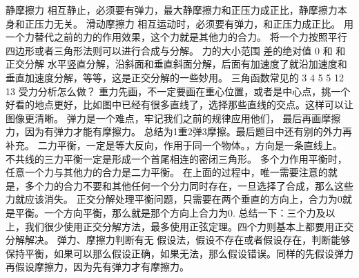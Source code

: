 \markdownRendererInterblockSeparator
{}静摩擦力 相互静止，必须要有弹力，最大静摩擦力和正压力成正比，静摩擦力本身和正压力无关。\markdownRendererParagraphSeparator
{}滑动摩擦力 相互运动时，必须要有弹力，和正压力成正比。\markdownRendererInterblockSeparator
{}
\markdownRendererSectionEnd \markdownRendererSectionBegin
{}\markdownRendererInterblockSeparator
{}用一个力替代之前的力的作用效果，这个力就是其他力的合力。\markdownRendererSoftLineBreak
{}将一个力按照平行四边形或者三角形法则可以进行合成与分解。\markdownRendererSoftLineBreak
{}力的大小范围 差的绝对值 0 和 和\markdownRendererParagraphSeparator
{}正交分解\markdownRendererParagraphSeparator
{}水平竖直分解，沿斜面和垂直斜面分解，后面有加速度了就沿加速度和垂直加速度分解，等等，这是正交分解的一些妙用。\markdownRendererParagraphSeparator
{}三角函数常见的\markdownRendererParagraphSeparator
{}3 4 5\markdownRendererSoftLineBreak
{}5 12 13\markdownRendererInterblockSeparator
{}
\markdownRendererSectionEnd \markdownRendererSectionBegin
{}\markdownRendererInterblockSeparator
{}受力分析怎么做？\markdownRendererParagraphSeparator
{}重力先画，不一定要画在重心位置，或者是中心点，挑一个好看的地点更好，比如图中已经有很多直线了，选择那些直线的交点。这样可以让图像更清晰。\markdownRendererParagraphSeparator
{}弹力是一个难点，牢记我们之前的规律应用他们，\markdownRendererParagraphSeparator
{}最后再画摩擦力，因为有弹力才能有摩擦力。\markdownRendererParagraphSeparator
{}总结为1重2弹3摩擦。最后题目中还有别的外力再补充。\markdownRendererParagraphSeparator
{}二力平衡，一定是等大反向，作用于同一个物体。，方向是一条直线上。\markdownRendererParagraphSeparator
{}不共线的三力平衡一定是形成一个首尾相连的密闭三角形。\markdownRendererParagraphSeparator
{}多个力作用平衡时，任意一个力与其他力的合力是二力平衡。\markdownRendererParagraphSeparator
{}在上面的过程中，唯一需要注意的就是，多个力的合力不要和其他任何一个分力同时存在，一旦选择了合成，那么这些力就应该消失。\markdownRendererParagraphSeparator
{}正交分解处理平衡问题，只需要在两个垂直的方向上，合力为0就是平衡。一个方向平衡，那么就是那个方向上合力为0.\markdownRendererParagraphSeparator
{}总结一下：三个力及以上，我们很少使用正交分解方法，最多使用正弦定理。四个力则基本上都要用正交分解解决。\markdownRendererInterblockSeparator
{}
\markdownRendererSectionEnd \markdownRendererSectionBegin
{}\markdownRendererInterblockSeparator
{}弹力、摩擦力判断有无\markdownRendererParagraphSeparator
{}假设法，假设不存在或者假设存在，判断能够保持平衡，如果可以那么假设正确，如果无法，那么假设错误。同样的先假设弹力再假设摩擦力，因为先有弹力才有摩擦力。\markdownRendererParagraphSeparator
